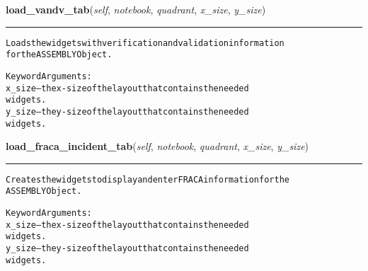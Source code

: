 \hspace{.8\funcindent}\begin{boxedminipage}{\funcwidth}

    \raggedright \textbf{load\_vandv\_tab}(\textit{self}, \textit{notebook}, \textit{quadrant}, \textit{x\_size}, \textit{y\_size})

    \vspace{-1.5ex}

    \rule{\textwidth}{0.5\fboxrule}
\setlength{\parskip}{2ex}
\begin{alltt}
Loads the widgets with verification and validation information
for the ASSEMBLY Object.

Keyword Arguments:
x\_size -- the x-size of the layout that contains the needed
          widgets.
y\_size -- the y-size of the layout that contains the needed
          widgets.
\end{alltt}

\setlength{\parskip}{1ex}
    \end{boxedminipage}

    \label{reliafree:assembly:Assembly:load_fraca_incident_tab}

    \vspace{0.5ex}

\hspace{.8\funcindent}\begin{boxedminipage}{\funcwidth}

    \raggedright \textbf{load\_fraca\_incident\_tab}(\textit{self}, \textit{notebook}, \textit{quadrant}, \textit{x\_size}, \textit{y\_size})

    \vspace{-1.5ex}

    \rule{\textwidth}{0.5\fboxrule}
\setlength{\parskip}{2ex}
\begin{alltt}
Creates the widgets to display and enter FRACA information for the
ASSEMBLY Object.

Keyword Arguments:
x\_size -- the x-size of the layout that contains the needed
          widgets.
y\_size -- the y-size of the layout that contains the needed
          widgets.
\end{alltt}

\setlength{\parskip}{1ex}
    \end{boxedminipage}


